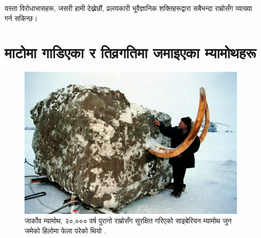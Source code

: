 \documentclass[10pt,twocolumn,letterpaper]{article}
\begin{document}
यस्ता विरोधाभासहरू, जसरी हामी देख्नेछौं, प्रलयकारी भूवैज्ञानिक शक्तिहरूद्वारा सबैभन्दा राम्रोसँग व्याख्या गर्न सकिन्छ।

\section{माटोमा गाडिएका र तिव्रगतिमा जमाइएका म्यामोथहरू}

\begin{figure}[t]
\begin{center}
   \includegraphics[width=1\linewidth]{jarkov-mammoth.jpg}
\end{center}
   \caption{जार्कोव म्यामोथ, २०,००० वर्ष पुरानो राम्रोसँग सुरक्षित गरिएको साइबेरियन म्यामोथ जुन जमेको हिलोमा फेला परेको थियो \cite{51}.}
\label{fig:1}
\label{fig:onecol}
\end{figure}
\end{document}
